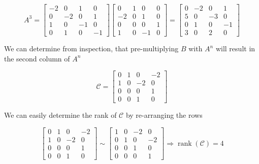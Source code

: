\documentclass{article}
\begin{document}
\begin{enumerate}[label=\alph*)]
\begin{enumerate}[label=\roman*)]
        \[
        A^3 = 
        \begin{bmatrix}
            -2 & 0 & 1 & 0 \\
            0 & -2 & 0 & 1 \\
            1 & 0 & -1 & 0 \\
            0 & 1 & 0 & -1
        \end{bmatrix}
        \begin{bmatrix}
            0 & 1 & 0 & 0 \\
            -2 & 0 & 1 & 0 \\
            0 & 0 & 0 & 1 \\
            1 & 0 & -1 & 0
        \end{bmatrix}
        = 
        \begin{bmatrix}
            0 & -2 & 0 & 1 \\
            5 & 0 & -3 & 0 \\
            0 & 1 & 0 & -1 \\
            3 & 0 & 2 & 0
        \end{bmatrix}
        \]

    We can determine from inspection, that pre-multiplying $B$ with $A^n$ will result in the second column of $A^n$

    \[
    \mathcal{C} = 
    \begin{bmatrix}
        0 & 1 & 0 & -2 \\
        1 & 0 & -2 & 0 \\
        0 & 0 & 0 & 1 \\
        0 & 0 & 1 & 0
    \end{bmatrix}
    \]

    We can easily determine the rank of $\mathcal{C}$ by re-arranging the rows

    \[
    \begin{bmatrix}
        0 & 1 & 0 & -2 \\
        1 & 0 & -2 & 0 \\
        0 & 0 & 0 & 1 \\
        0 & 0 & 1 & 0
    \end{bmatrix}
    \sim
    \begin{bmatrix}
        1 & 0 & -2 & 0 \\
        0 & 1 & 0 & -2 \\
        0 & 0 & 1 & 0 \\
        0 & 0 & 0 & 1
    \end{bmatrix}
    \Rightarrow \operatorname{rank}(\mathcal{C}) = 4
    \]


\end{enumerate}
\end{enumerate}
\end{document}
